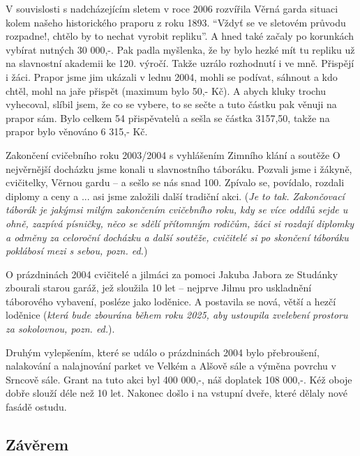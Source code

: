 V souvislosti s nadcházejícím sletem v roce 2006 rozvířila Věrná garda
situaci kolem našeho historického praporu z roku 1893. ``Vždyť se ve
sletovém průvodu rozpadne!, chtělo by to nechat vyrobit repliku''. A
hned také začaly po korunkách vybírat nutných 30 000,-. Pak padla
myšlenka, že by bylo hezké mít tu repliku už na slavnostní akademii ke
120. výročí. Takže uzrálo rozhodnutí i ve mně. Přispějí i žáci. Prapor
jsme jim ukázali v lednu 2004, mohli se podívat, sáhnout a kdo chtěl,
mohl na jaře přispět (maximum bylo 50,- Kč). A abych kluky trochu
vyhecoval, slíbil jsem, že co se vybere, to se sečte a tuto částku pak
věnuji na prapor sám. Bylo celkem 54 přispěvatelů a sešla se částka
3157,50, takže na prapor bylo věnováno 6 315,- Kč.

Zakončení cvičebního roku 2003/2004 s vyhlášením Zimního klání a soutěže
O nejvěrnější docházku jsme konali u slavnostního táboráku. Pozvali jsme
i žákyně, cvičitelky, Věrnou gardu -- a sešlo se nás snad 100. Zpívalo
se, povídalo, rozdali diplomy a ceny a ... asi jsme založili další
tradiční akci. (\emph{Je to tak. Zakončovací táborák je jakýmsi milým
zakončením cvičebního roku, kdy se více oddílů sejde u ohně, zazpívá
písničky, něco se sdělí přítomným rodičům, žáci si rozdají diplomky a
odměny za celoroční docházku a další soutěže, cvičitelé si po skončení
táboráku poklábosí mezi s sebou, pozn. ed.})

O prázdninách 2004 cvičitelé a jilmáci za pomoci Jakuba Jabora ze
Studánky zbourali starou garáž, jež sloužila 10 let -- nejprve Jilmu pro
uskladnění táborového vybavení, posléze jako loděnice. A postavila se
nová, větší a hezčí loděnice (\emph{která bude zbourána během roku 2025,
aby ustoupila zvelebení prostoru za sokolovnou, pozn. ed.}).

Druhým vylepšením, které se událo o prázdninách 2004 bylo přebroušení,
nalakování a nalajnování parket ve Velkém a Alšově sále a výměna povrchu
v Srncově sále. Grant na tuto akci byl 400 000,-, náš doplatek 108
000,-. Kéž oboje dobře slouží déle než 10 let. Nakonec došlo i na
vstupní dveře, které dělaly nové fasádě ostudu.

\subsection{Závěrem}\label{zuxe1vux11brem}

